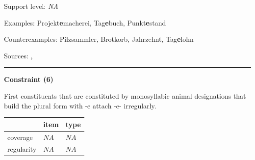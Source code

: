 \noindent
Support level: \textit{NA}

\vspace{0.3em}

\noindent
Examples: Projekt\textbf{e}macherei, Tag\textbf{e}buch, Punkt\textbf{e}stand

\noindent
Counterexamples: Pilz{\zeroLinker}sammler, Brot{\zeroLinker}korb, Jahr{\zeroLinker}zehnt, Tag\textbf{e}lohn

\vspace{0.3em}

\noindent
Sources: \citet[103]{ortner_mueller-bollhagen_1991}, \citet[29]{schaefer_pankratz_2018}

\vspace{0.35em}
\hrule




\vspace{0.4em}

\begin{center}
\textbf{Constraint (6)}
\end{center}

\noindent
First constituents that are constituted by monosyllabic animal designations that build the plural form with -e attach -e- irregularly.
\vspace{0.5em}


\vspace{-0.25em}

\begin{table}[!ht]
\begin{center}
\setlength{\extrarowheight}{1pt}
\begin{tabularx}{\columnwidth}{|X|X|X|}
\hline
 & item & type \\
\hline
 coverage & $NA$ & $NA$ \\
\hline
 regularity & $NA$ & $NA$ \\
\hline
\end{tabularx}
\end{center}
\end{table}

